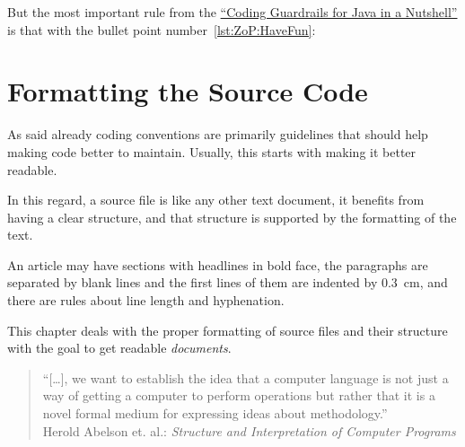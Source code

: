 \documentclass[11pt,a4paper, titlepage, parskip=half, headsepline, footsepline, cleardoublepage=current, headheight=1cm]{scrbook}
\newcommand*{\ngref}{\hyperref[lst:NutshellGuardrails]{“Coding Guardrails for Java in a Nutshell”}}
\begin{document}
But the most important rule from the \ngref{} is that with the bullet point number~\ref{lst:ZoP:HaveFun}:

\begin{center}
	\begin{huge}
	\end{huge}
\end{center}


\chapter{Formatting the Source Code}\label{sec:FormattingTheSourceCode}
As said already coding conventions are primarily guidelines that should help making code better to maintain. Usually, this starts with making it better readable.

In this regard, a source file is like any other text document, it benefits from having a clear structure, and that structure is supported by the formatting of the text.

An article may have sections with headlines in bold face, the paragraphs are separated by blank lines and the first lines of them are indented by 0.3~cm, and there are rules about line length and hyphenation.

This chapter deals with the proper formatting of source files and their structure with the goal to get readable \textit{documents}.

\begin{quotation}
“[…], we want to establish the idea that a computer language is not just a way of getting a computer to perform operations but rather that it is a novel formal medium for expressing ideas
about methodology.”\\
Herold Abelson et. al.: \textit{Structure and Interpretation of Computer Programs}
\autocite{Sussman:StructureAndInterpretationOfComputerPrograms}
\end{quotation}
\end{document}
